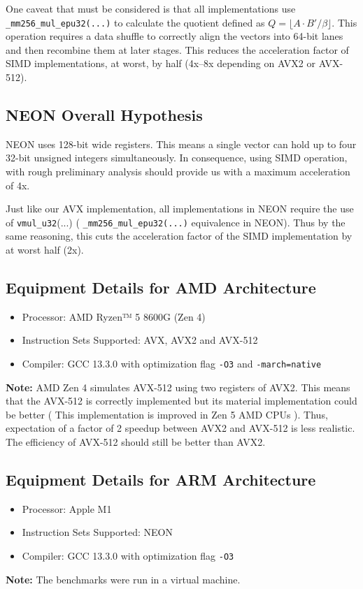 \documentclass{article}
\newcommand{\pointlabel}[1]{\par\smallskip\noindent\textbf{\textcolor{accentorange}{#1:}} }
\begin{document}
One caveat that must be considered is that all implementations use \texttt{\_mm256\_mul\_epu32(...)} to calculate the quotient defined as $Q = \lfloor A \cdot B'/\beta \rfloor$. This operation requires a data shuffle to correctly align the vectors into 64-bit lanes and then recombine them at later stages. This reduces the acceleration factor of SIMD implementations, at worst, by half (4x--8x depending on AVX2 or AVX-512).

\subsection{NEON Overall Hypothesis}
NEON uses 128-bit wide registers. This means a single vector can hold up to four 32-bit unsigned integers simultaneously. In consequence, using SIMD operation, with rough preliminary analysis should provide us with a maximum acceleration of 4x.

Just like our AVX implementation, all implementations in NEON require the use of \texttt{vmul\_u32}(...) ( \texttt{\_mm256\_mul\_epu32(...)} equivalence in NEON). Thus by the same reasoning, this cuts the acceleration factor of the SIMD implementation by at worst half (2x).

\subsection{Equipment Details for AMD Architecture}
\begin{itemize}
    \item Processor: AMD Ryzen™ 5 8600G (Zen 4)
    \item Instruction Sets Supported: AVX, AVX2 and AVX-512
    \item Compiler: GCC 13.3.0 with optimization flag \texttt{-O3} and \texttt{-march=native}
\end{itemize}
\pointlabel{Note} AMD Zen 4 simulates AVX-512 using two registers of AVX2. This means that the AVX-512 is correctly implemented but its material implementation could be better ( This implementation is improved in Zen 5 AMD CPUs ). Thus, expectation of a factor of 2 speedup between AVX2 and AVX-512 is less realistic. The efficiency of AVX-512 should still be better than AVX2.

\subsection{Equipment Details for ARM Architecture}
\begin{itemize}
    \item Processor: Apple M1
    \item Instruction Sets Supported: NEON
    \item Compiler: GCC 13.3.0 with optimization flag \texttt{-O3}
\end{itemize}
\pointlabel{Note}The benchmarks were run in a virtual machine.
\end{document}
